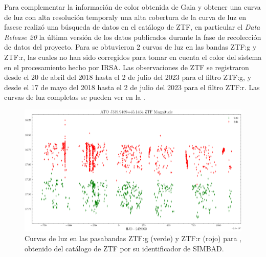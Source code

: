 Para complementar la información de color obtenida de Gaia y obtener una curva
de luz con alta resolución temporal\textemdash y una alta cobertura de la curva
de luz en fase\textemdash se realizó una búsqueda de datos en el catálogo de
ZTF, en particular el \textit{Data Release 20} la última versión de los datos
publicados durante la fase de recolección de datos del proyecto. Para \atoObjId
se obtuvieron 2 curvas de luz en las bandas ZTF:g y ZTF:r, las cuales no han
sido corregidos para tomar en cuenta el color del sistema en el procesamiento
hecho por IRSA. Las observaciones de ZTF se registraron desde el 20 de abril del
2018 hasta el 2 de julio del 2023 para el filtro ZTF:g, y desde el 17 de mayo
del 2018 hasta el 2 de julio del 2023 para el filtro ZTF:r. Las curvas de luz
completas se pueden ver en la .

\begin{figure}[!ht]
	\centering
	\includegraphics[scale=0.42]{Muestra/Secciones/Figures/Figura ZTF Light Curves.png}
	\caption{Curvas de luz en las pasabandas ZTF:g (verde) y ZTF:r (rojo) para \atoObjId, 
	obtenido del catálogo de ZTF por su identificador de SIMBAD.}
	\label{figuraZtfCurvasLuz}
\end{figure}